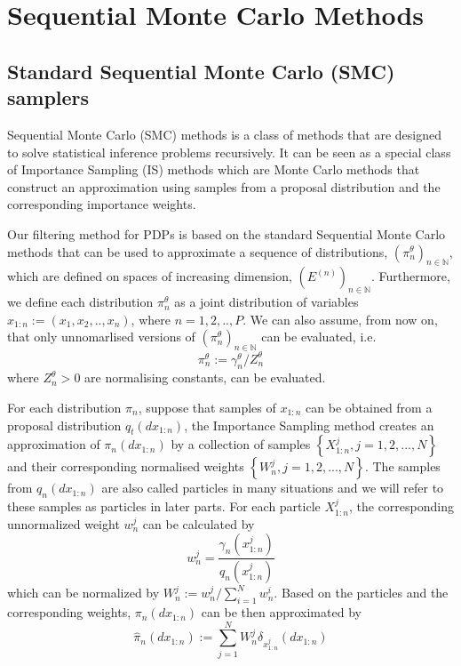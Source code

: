 \documentclass[12pt,a4paper]{article}
\begin{document}
\section{Sequential Monte Carlo Methods}
\subsection{Standard Sequential Monte Carlo (SMC) samplers}
Sequential Monte Carlo (SMC) methods is a class of methods that are designed to solve statistical inference problems recursively. It can be seen as a special class of Importance Sampling (IS) methods which are Monte Carlo methods that construct an approximation using samples from a proposal distribution and the corresponding importance weights. 

Our filtering method for PDPs is based on the standard Sequential Monte Carlo methods that can be used to approximate a sequence of distributions, $(\pi_n^{\theta})_{n \in \mathbb{N}}$, which are defined on spaces of increasing dimension, $\left(E^{(n)}\right)_{n \in \mathbb{N}}$. Furthermore, we define each distribution $\pi_n^{\theta}$ as a joint distribution of variables $x_{1:n}:= (x_1,x_2,..,x_n)$, where $n = 1,2,..,P$.
We can also assume, from now on, that only unnomarlised versions of $(\pi_n^{\theta})_{n \in \mathbb{N}}$ can be evaluated, i.e.
$$\pi_n^{\theta} := \gamma_n^{\theta}/Z_n^{\theta}$$
where $Z_n^{\theta} >0$ are normalising constants, can be evaluated.

For each distribution $\pi_n$, suppose that samples of $x_{1:n}$ can be obtained from a proposal distribution $q_t(dx_{1:n})$, the Importance Sampling method creates an approximation of $\pi_n(dx_{1:n})$ by a collection of samples $\left\{X_{1:n}^j, j=1,2,...,N\right\}$ and their corresponding normalised weights $\left\{W_n^j, j= 1,2,...,N\right\}$. The samples from $q_n(dx_{1:n})$ are also called particles in many situations and we will refer to these samples as particles in later parts. For each particle $X_{1:n}^j$, the corresponding unnormalized weight $w_n^j$ can be calculated by \begin{equation}
    \label{Standard SMC -  IS unnormalized weight}
    w_n^j = \frac{\gamma_n\left(x_{1:n}^j\right)}{q_n\left(x_{1:n}^j\right)}
\end{equation}
which can be normalized by $W_n^j := w_n^j/\sum_{i=1}^{N}w_n^i$. Based on the particles and the corresponding weights, $\pi_n(dx_{1:n})$ can be then approximated by 
\begin{equation}
    \label{Standard SMC - IS target approx}
    \hat{\pi}_n(dx_{1:n}) := \sum_{j=1}^{N} W_n^j \delta_{x_{1:n}^j}(dx_{1:n})
\end{equation}
\end{document}
